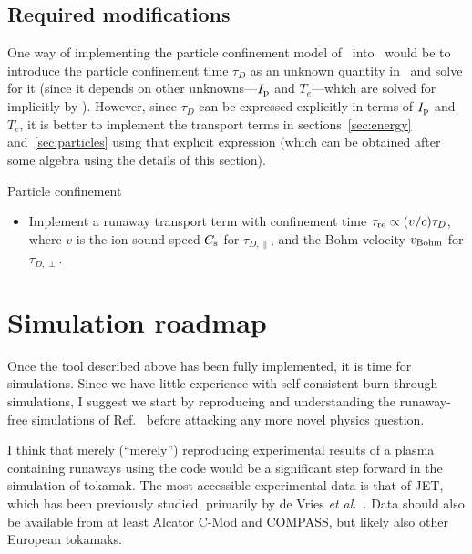 \documentclass{notes}
\newcommand{\Ip}{I_{\rm p}}
\begin{document}
    \subsection{Required modifications}
    One way of implementing the particle confinement model of \DYON\ into
    \DREAM\ would be to introduce the particle confinement time $\tau_D$ as an
    unknown quantity in \DREAM\ and solve for it (since it depends on other
    unknowns---$\Ip$ and $T_e$---which are solved for implicitly by \DREAM).
    However, since $\tau_D$ can be expressed explicitly in terms of $\Ip$ and
    $T_e$, it is better to implement the transport terms in
    sections~\ref{sec:energy} and~\ref{sec:particles} using that explicit
    expression (which can be obtained after some algebra using the details of
    this section).
    
    \begin{summarybox}{Particle confinement}
        \begin{itemize}
            \item Implement a runaway transport term with confinement time
            $\tau_{\rm re}\propto (v/c)\tau_D$, where $v$ is the ion sound speed
            $C_{\rm s}$ for $\tau_{D,\|}$, and the Bohm velocity $v_{\rm Bohm}$
            for $\tau_{D,\perp}$.
        \end{itemize}
    \end{summarybox}

    \section{Simulation roadmap}
    Once the tool described above has been fully implemented, it is time for
    simulations. Since we have little experience with self-consistent
    burn-through simulations, I suggest we start by reproducing and
    understanding the runaway-free simulations of Ref.~\cite{Kim2012} before
    attacking any more novel physics question.

    I think that merely (``merely'') reproducing experimental results of a
    plasma containing runaways using the code would be a significant step
    forward in the simulation of tokamak. The most accessible experimental data
    is that of JET, which has been previously studied, primarily by de Vries
    {\em et al.}~\cite{deVries2020}. Data should also be available from at least
    Alcator C-Mod and COMPASS, but likely also other European tokamaks.
\end{document}
